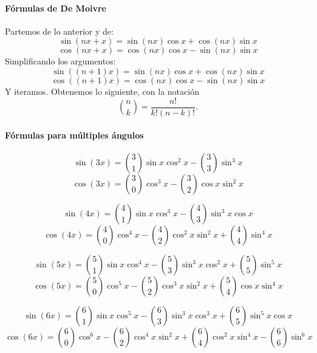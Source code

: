 \documentclass[12pt, a4paper]{article}
\theoremstyle{rioplatense}
\begin{document}
\paragraph{Fórmulas de De Moivre}
Partemos de lo anterior y de:
\[
\sin(nx + x) = \sin(nx) \cos x + \cos(nx) \sin x
\]
\[
\cos(nx + x) = \cos(nx) \cos x - \sin(nx) \sin x
\]
Simplificando los argumentos:
\[
\sin((n+1)x) = \sin(nx) \cos x + \cos(nx) \sin x
\]
\[
\cos((n+1)x) = \cos(nx) \cos x - \sin(nx) \sin x
\]
Y iteramos. Obtenemos lo siguiente, con la notación
\[
\binom{n}{k} = \frac{n!}{k!(n - k)!}.
\]

\paragraph{Fórmulas para múltiples ángulos}

\[
\sin(3x) = \binom{3}{1} \sin x \cos^2 x - \binom{3}{3} \sin^3 x
\]
\[
\cos(3x) = \binom{3}{0} \cos^3 x - \binom{3}{2} \cos x \sin^2 x
\]

\[
\sin(4x) = \binom{4}{1} \sin x \cos^3 x - \binom{4}{3} \sin^3 x \cos x
\]
\[
\cos(4x) = \binom{4}{0} \cos^4 x - \binom{4}{2} \cos^2 x \sin^2 x + \binom{4}{4} \sin^4 x
\]

\[
\sin(5x) = \binom{5}{1} \sin x \cos^4 x - \binom{5}{3} \sin^3 x \cos^2 x + \binom{5}{5} \sin^5 x
\]
\[
\cos(5x) = \binom{5}{0} \cos^5 x - \binom{5}{2} \cos^3 x \sin^2 x + \binom{5}{4} \cos x \sin^4 x
\]

\[
\sin(6x) = \binom{6}{1} \sin x \cos^5 x - \binom{6}{3} \sin^3 x \cos^3 x + \binom{6}{5} \sin^5 x \cos x
\]
\[
\cos(6x) = \binom{6}{0} \cos^6 x - \binom{6}{2} \cos^4 x \sin^2 x + \binom{6}{4} \cos^2 x \sin^4 x - \binom{6}{6} \sin^6 x
\]
\end{document}
